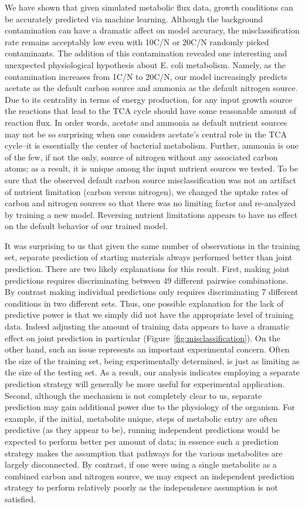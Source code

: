 \documentclass[12pt]{article}
\begin{document}
We have shown that given simulated metabolic flux data, growth conditions can be accurately predicted via machine learning. Although the background contamination can have a dramatic affect on model accuracy, the misclassification rate remains acceptably low even with 10C/N or 20C/N randomly picked contaminants. The addition of this contamination revealed one interesting and unexpected physiological hypothesis about E. coli metabolism. Namely, as the contamination increases from 1C/N to 20C/N, our model increasingly predicts acetate as the default carbon source and ammonia as the default nitrogen source.  Due to its centrality in terms of energy production, for any input growth source the reactions that lead to the TCA cycle should have some reasonable amount of reaction flux. In order words, acetate and ammonia as default nutrient sources may not be so surprising when one considers acetate's central role in the TCA cycle--it is essentially the center of bacterial metabolism. Further, ammonia is one of the few, if not the only, source of nitrogen without any associated carbon atoms; as a result, it is unique among the input nutrient sources we tested. To be sure that the observed default carbon source misclassification was not an artifact of nutrient limitation (carbon versus nitrogen), we changed the uptake rates of carbon and nitrogen sources so that there was no limiting factor and re-analyzed by training a new model. Reversing nutrient limitations appears to have no effect on the default behavior of our trained model.

It was surprising to us that given the same number of observations in the training set, separate prediction of starting materials always performed better than joint prediction. There are two likely explanations for this result. First, making joint predictions requires discriminating between 49 different pairwise combinations. By contrast making individual predictions only requires discriminating 7 different conditions in two different sets. Thus, one possible explanation for the lack of predictive power is that we simply did not have the appropriate level of training data. Indeed adjusting the amount of training data appears to have a dramatic effect on joint prediction in particular (Figure~\ref{fig:misclassification}). On the other hand, such an issue represents an important experimental concern. Often the size of the training set, being experimentally determined, is just as limiting as the size of the testing set. As a result, our analysis indicates employing a separate prediction strategy will generally be more useful for experimental application. Second, although the mechanism is not completely clear to us, separate prediction may gain additional power due to the physiology of the organism. For example, if the initial, metabolite unique, steps of metabolic entry are often predictive (as they appear to be), running independent predictions would be expected to perform better per amount of data; in essence such a prediction strategy makes the assumption that pathways for the various metabolites are largely disconnected. By contrast, if one were using a single metabolite as a combined carbon and nitrogen source, we may expect an independent prediction strategy to perform relatively poorly as the independence assumption is not satisfied.
\end{document}
